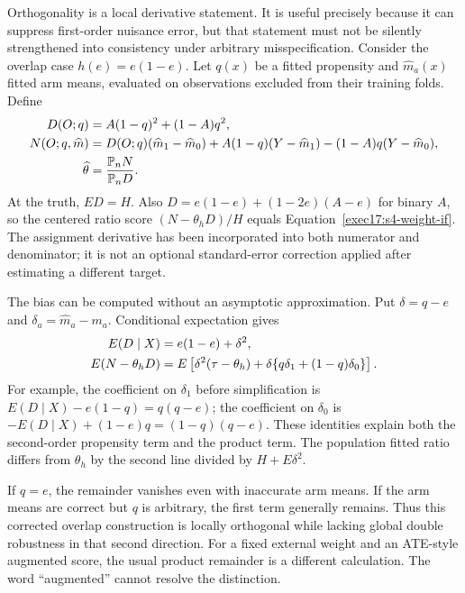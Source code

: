 Orthogonality is a local derivative statement. It is useful precisely because
it can suppress first-order nuisance error, but that statement must not be
silently strengthened into consistency under arbitrary misspecification.
Consider the overlap case $h(e)=e(1-e)$. Let $q(x)$ be a fitted propensity and
$\widehat m_a(x)$ fitted arm means, evaluated on observations excluded from
their training folds. Define
\begin{align}
 D(O;q)&=A(1-q)^2+(1-A)q^2,\notag\\
 N(O;q,\widehat m)&=D(O;q)(\widehat m_1-\widehat m_0)
      +A(1-q)(Y-\widehat m_1)
      -(1-A)q(Y-\widehat m_0),\notag\\
 \widehat\theta&=\frac{\mathbb P_nN}{\mathbb P_nD}.
 \label{exec17:s4-overlap-ratio}
\end{align}
At the truth, $E D=H$. Also
$D=e(1-e)+(1-2e)(A-e)$ for binary $A$, so the centered ratio score
$(N-\theta_hD)/H$ equals Equation~\eqref{exec17:s4-weight-if}.
The assignment derivative has been incorporated into both numerator and
denominator; it is not an optional standard-error correction applied after
estimating a different target.

The bias can be computed without an asymptotic approximation. Put
$\delta=q-e$ and $\delta_a=\widehat m_a-m_a$. Conditional expectation gives
\begin{align}
 E(D\mid X)&=e(1-e)+\delta^2,\notag\\
 E(N-\theta_hD)&=
 E\left[\delta^2(\tau-\theta_h)
       +\delta\{q\delta_1+(1-q)\delta_0\}\right].
 \label{exec17:s4-overlap-remainder}
\end{align}
For example, the coefficient on $\delta_1$ before simplification is
$E(D\mid X)-e(1-q)=q(q-e)$; the coefficient on $\delta_0$ is
$-E(D\mid X)+(1-e)q=(1-q)(q-e)$. These identities explain both the
second-order propensity term and the product term. The population fitted
ratio differs from $\theta_h$ by the second line divided by
$H+E\delta^2$.~\citep{exec17_s4_math}

If $q=e$, the remainder vanishes even with inaccurate arm means. If the arm
means are correct but $q$ is arbitrary, the first term generally remains.
Thus this corrected overlap construction is locally orthogonal while lacking
global double robustness in that second direction. For a fixed external
weight and an ATE-style augmented score, the usual product remainder is a
different calculation. The word ``augmented'' cannot resolve the distinction.

